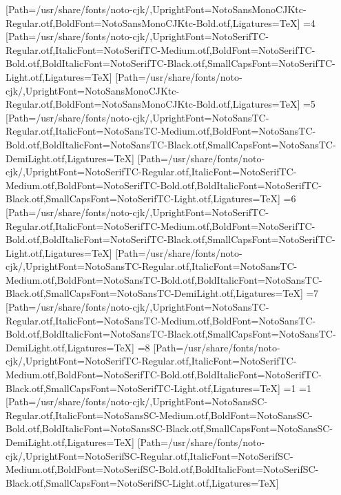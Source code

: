 [Path=/usr/share/fonts/noto-cjk/,UprightFont=NotoSansMonoCJKtc-Regular.otf,BoldFont=NotoSansMonoCJKtc-Bold.otf,Ligatures=TeX]
\else\ifnum\value{CJKFonts}=4
[Path=/usr/share/fonts/noto-cjk/,UprightFont=NotoSerifTC-Regular.otf,ItalicFont=NotoSerifTC-Medium.otf,BoldFont=NotoSerifTC-Bold.otf,BoldItalicFont=NotoSerifTC-Black.otf,SmallCapsFont=NotoSerifTC-Light.otf,Ligatures=TeX]
[Path=/usr/share/fonts/noto-cjk/,UprightFont=NotoSansMonoCJKtc-Regular.otf,BoldFont=NotoSansMonoCJKtc-Bold.otf,Ligatures=TeX]
\else\ifnum\value{CJKFonts}=5
[Path=/usr/share/fonts/noto-cjk/,UprightFont=NotoSansTC-Regular.otf,ItalicFont=NotoSansTC-Medium.otf,BoldFont=NotoSansTC-Bold.otf,BoldItalicFont=NotoSansTC-Black.otf,SmallCapsFont=NotoSansTC-DemiLight.otf,Ligatures=TeX]
[Path=/usr/share/fonts/noto-cjk/,UprightFont=NotoSerifTC-Regular.otf,ItalicFont=NotoSerifTC-Medium.otf,BoldFont=NotoSerifTC-Bold.otf,BoldItalicFont=NotoSerifTC-Black.otf,SmallCapsFont=NotoSerifTC-Light.otf,Ligatures=TeX]
\else\ifnum\value{CJKFonts}=6
[Path=/usr/share/fonts/noto-cjk/,UprightFont=NotoSerifTC-Regular.otf,ItalicFont=NotoSerifTC-Medium.otf,BoldFont=NotoSerifTC-Bold.otf,BoldItalicFont=NotoSerifTC-Black.otf,SmallCapsFont=NotoSerifTC-Light.otf,Ligatures=TeX]
[Path=/usr/share/fonts/noto-cjk/,UprightFont=NotoSansTC-Regular.otf,ItalicFont=NotoSansTC-Medium.otf,BoldFont=NotoSansTC-Bold.otf,BoldItalicFont=NotoSansTC-Black.otf,SmallCapsFont=NotoSansTC-DemiLight.otf,Ligatures=TeX]
\else\ifnum\value{CJKFonts}=7
[Path=/usr/share/fonts/noto-cjk/,UprightFont=NotoSansTC-Regular.otf,ItalicFont=NotoSansTC-Medium.otf,BoldFont=NotoSansTC-Bold.otf,BoldItalicFont=NotoSansTC-Black.otf,SmallCapsFont=NotoSansTC-DemiLight.otf,Ligatures=TeX]
\else\ifnum\value{CJKFonts}=8
[Path=/usr/share/fonts/noto-cjk/,UprightFont=NotoSerifTC-Regular.otf,ItalicFont=NotoSerifTC-Medium.otf,BoldFont=NotoSerifTC-Bold.otf,BoldItalicFont=NotoSerifTC-Black.otf,SmallCapsFont=NotoSerifTC-Light.otf,Ligatures=TeX]
\fi\fi\fi\fi\fi\fi\fi\fi\else
\ifnum\value{CJKLanguage}=1
\ifnum\value{CJKFonts}=1
[Path=/usr/share/fonts/noto-cjk/,UprightFont=NotoSansSC-Regular.otf,ItalicFont=NotoSansSC-Medium.otf,BoldFont=NotoSansSC-Bold.otf,BoldItalicFont=NotoSansSC-Black.otf,SmallCapsFont=NotoSansSC-DemiLight.otf,Ligatures=TeX]
[Path=/usr/share/fonts/noto-cjk/,UprightFont=NotoSerifSC-Regular.otf,ItalicFont=NotoSerifSC-Medium.otf,BoldFont=NotoSerifSC-Bold.otf,BoldItalicFont=NotoSerifSC-Black.otf,SmallCapsFont=NotoSerifSC-Light.otf,Ligatures=TeX]
